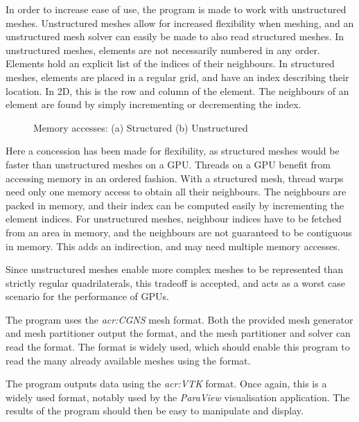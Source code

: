 In order to increase ease of use, the program is made to work with unstructured meshes. Unstructured
meshes allow for increased flexibility when meshing, and an unstructured mesh solver can easily be
made to also read structured meshes. In unstructured meshes, elements are not necessarily numbered
in any order. Elements hold an explicit list of the indices of their neighbours. In structured
meshes, elements are placed in a regular grid, and have an index describing their location. In 2D,
this is the row and column of the element. The neighbours of an element are found by simply
incrementing or decrementing the index.

\begin{figure}[H]
	\centering
	\hfill
	\caption{Memory accesses: (a) Structured (b) Unstructured}
	\label{fig:mesh_memory}
\end{figure}

Here a concession has been made for flexibility, as structured meshes would be faster than
unstructured meshes on a GPU. Threads on a GPU benefit from accessing memory in an ordered fashion.
With a structured mesh, thread warps need only one memory access to obtain all their neighbours. The
neighbours are packed in memory, and their index can be computed easily by incrementing the element
indices. For unstructured meshes, neighbour indices have to be fetched from an area in memory, and
the neighbours are not guaranteed to be contiguous in memory. This adds an indirection, and may need
multiple memory accesses.

Since unstructured meshes enable more complex meshes to be represented than strictly regular
quadrilaterals, this tradeoff is accepted, and acts as a worst case scenario for the performance of
GPUs.

The program uses the \textit{\acrfull{acr:CGNS}} mesh format. Both the provided mesh generator and mesh partitioner output
the format, and the mesh partitioner and solver can read the format. The format is widely used,
which should enable this program to read the many already available meshes using the format.

The program outputs data using the \textit{\acrfull{acr:VTK}} format. Once again, this is a widely
used format, notably used by the \textit{ParaView} visualisation application. The results of the
program should then be easy to manipulate and display.

